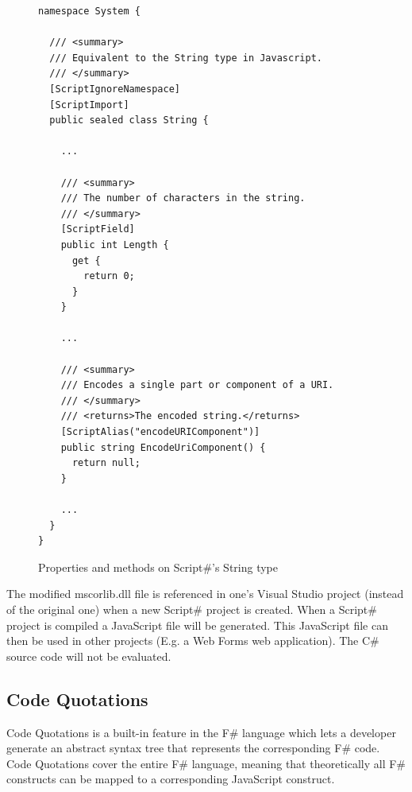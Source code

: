		\begin{figure}
		\label{fig:scriptsharp_net_types}
			\begin{lstlisting}[language=CSharp,classoffset=1,morekeywords={String}]
namespace System {

  /// <summary>
  /// Equivalent to the String type in Javascript.
  /// </summary>
  [ScriptIgnoreNamespace]
  [ScriptImport]
  public sealed class String {

    ...

    /// <summary>
    /// The number of characters in the string.
    /// </summary>
    [ScriptField]
    public int Length {
      get {
        return 0;
      }
    }

    ...

    /// <summary>
    /// Encodes a single part or component of a URI.
    /// </summary>
    /// <returns>The encoded string.</returns>
    [ScriptAlias("encodeURIComponent")]
    public string EncodeUriComponent() {
      return null;
    }

    ...
  }
}

			\end{lstlisting}
			\caption{Properties and methods on Script\#'s String type}
		\end{figure}

		The modified mscorlib.dll file is referenced in one's Visual Studio project (instead of the original one) when a new Script\# project is created. When a Script\# project is compiled a JavaScript file will be generated. This JavaScript file can then be used in other projects (E.g. a Web Forms web application). The C\# source code will not be evaluated.




	\subsection{Code Quotations} %
	\label{ssub:code_quotations}
		Code Quotations is a built-in feature in the F\# language which lets a developer generate an abstract syntax tree that represents the corresponding F\# code. Code Quotations cover the entire F\# language, meaning that theoretically all F\# constructs can be mapped to a corresponding JavaScript construct.

